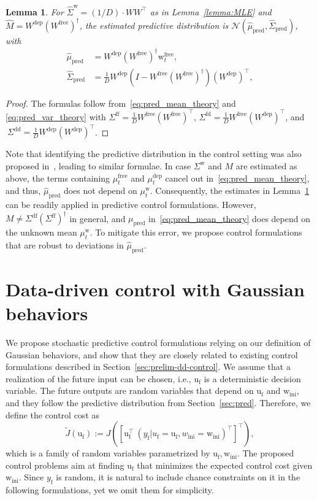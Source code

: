 \documentclass[letterpaper, 10 pt, conference]{ieeeconf}
\def\wi{w_\mathrm{ini}}
\def\wir{\mathrm{w}_\mathrm{ini}}
\def\uf{u_\mathrm{f}}
\def\ufr{\mathrm{u}_\mathrm{f}}
\def\yf{y_\mathrm{f}}
\def\mp{\mu_\mathrm{pred}}
\def\mph{\hat{\mu}_\mathrm{pred}}
\def\mw{\mu^\mathrm{w}_t}
\def\mdep{\mu^\mathrm{dep}_t}
\def\mfree{\mu^\mathrm{free}_t}
\def\Sw{\Sigma^\mathrm{w}}
\def\Swh{\hat{\Sigma}^\mathrm{w}}
\def\Sph{\hat{\Sigma}_\mathrm{pred}}
\newtheorem{lemma}{Lemma}
\begin{document}
\begin{lemma} \label{lemma:pred_estim}
    For $\Swh=(1/D)\cdot W W^\top$ as in Lemma~\ref{lemma:MLE} and $\hat{M}=W^\mathrm{dep}(W^\mathrm{free})^\dagger$, the estimated predictive distribution is $\mathcal{N}(\mph,\Sph)$, with
\begin{align}
    \mph & = W^\mathrm{dep}(W^\mathrm{free})^\dagger
    \mathrm{w}^\mathrm{free}_t, \label{eq:pred_mean}\\ 
    \Sph & = \frac{1}{D} W^\mathrm{dep}\left(I-W^\mathrm{free}(W^\mathrm{free})^\dagger\right)(W^\mathrm{dep})^\top, \label{eq:var_mean}
\end{align}
\end{lemma}
\begin{proof}
    The formulas follow from~\eqref{eq:pred_mean_theory} and \eqref{eq:pred_var_theory} with $\Sigma^\mathrm{ff} = \frac{1}{D}W^\mathrm{free}(W^\mathrm{free})^\top$, 
    $\Sigma^\mathrm{fd} = \frac{1}{D}W^\mathrm{free}(W^\mathrm{dep})^\top$, and $~\Sigma^\mathrm{dd} = \frac{1}{D}W^\mathrm{dep}(W^\mathrm{dep})^\top$.
\end{proof}
Note that identifying the predictive distribution in the control setting was also proposed in~\cite{fiedler2023probabilistic}, leading to similar formulae.
In case $\Sw$ and $M$ are estimated as above, the terms containing $\mfree$ and $\mdep$ cancel out in~\eqref{eq:pred_mean_theory}, and thus, $\mph$ does not depend on $\mw$.
Consequently, the estimates in Lemma~\ref{lemma:pred_estim} can be readily applied in predictive control formulations.
However, $M\neq \Sigma^\mathrm{df} (\Sigma^\mathrm{ff})^\dagger$ in general, and $\mp$ in~\eqref{eq:pred_mean_theory} does depend on the unknown mean $\mw$.
To mitigate this error, we propose control formulations that are robust to deviations in $\mph$.


\section{Data-driven control with Gaussian behaviors} \label{sec:dd_control}
We propose stochastic predictive control formulations relying on our definition of Gaussian behaviors, and show that they are closely related to existing control formulations described in Section~\ref{sec:prelim-dd-control}.
We assume that a realization of the future input can be chosen, i.e., $\ufr$ is a deterministic decision variable.
The future outputs are random variables that depend on $\ufr$ and $\wir$, and they follow the predictive distribution from Section~\ref{sec:pred}.
Therefore, we define the control cost as 
$$
\tilde{J}(\ufr) := J([\ufr^\top~(\yf|\uf=\ufr,\wi=\wir)^\top]^\top),
$$
which is a family of random variables parametrized by $\ufr, \wir$.
The proposed control problems aim at finding $\ufr$ that minimizes the expected control cost given $\wir$.
Since $\yf$ is random, it is natural to include chance constraints on it in the following formulations, yet we omit them for simplicity.
\end{document}
